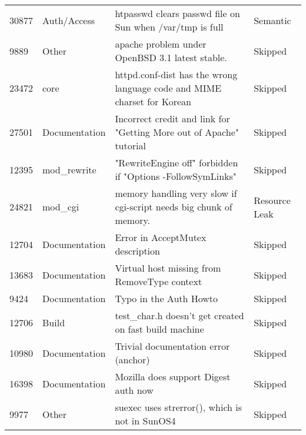 \begin{longtable}[c]{llll}
30877  & Auth/Access        & htpasswd clears passwd file on Sun when /var/tmp is full                                                       & Semantic          \\
9889   & Other              & apache problem under OpenBSD 3.1 latest stable.                                                                & Skipped           \\
23472  & core               & httpd.conf-dist has the wrong language code and MIME charset  for Korean                                       & Skipped           \\
27501  & Documentation      & Incorrect credit and link for "Getting More out of Apache" tutorial                                            & Skipped           \\
12395  & mod\_rewrite       & "RewriteEngine off" forbidden if "Options -FollowSymLinks"                                                     & Skipped           \\
24821  & mod\_cgi           & memory handling very slow if cgi-script needs big chunk of memory.                                             & Resource Leak     \\
12704  & Documentation      & Error in AcceptMutex description                                                                               & Skipped           \\
13683  & Documentation      & Virtual host missing from RemoveType context                                                                   & Skipped           \\
9424   & Documentation      & Typo in the Auth Howto                                                                                         & Skipped           \\
12706  & Build              & test\_char.h doesn't get created on fast build machine                                                         & Skipped           \\
10980  & Documentation      & Trivial documentation error (anchor)                                                                           & Skipped           \\
16398  & Documentation      & Mozilla does support Digest auth now                                                                           & Skipped           \\
9977   & Other              & suexec uses strerror(), which is not in SunOS4                                                                 & Skipped           \\

\end{longtable}
